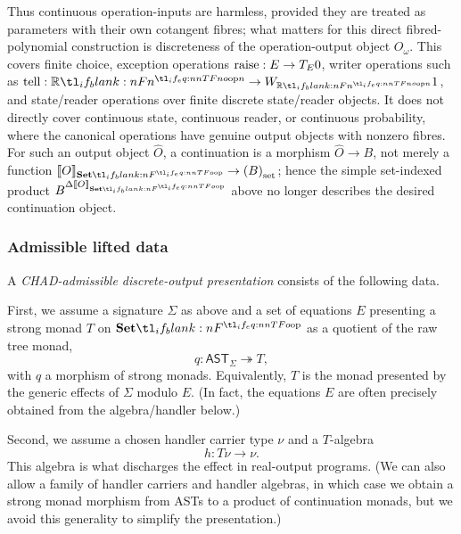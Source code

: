 \documentclass[11pt,a4paper]{article}
\theoremstyle{definition}
\theoremstyle{remark}
\providecommand{\AST}{\mathsf{AST}}
\providecommand{\base}[1]{\left(#1\right)_{\mathrm{set}}}
\providecommand{\setint}[1]{\llbracket #1\rrbracket_{\Set}}
\begin{document}
Thus continuous operation-inputs are harmless, provided they are treated as parameters with their own cotangent fibres; what matters for this direct fibred-polynomial construction is discreteness of the operation-output object \( O_{\omega} \). This covers finite choice, exception operations \( \opn{raise}:E\to T_E0 \), writer operations such as \( \opn{tell}:\R[n]\to W_{\R[n]}1 \), and state/reader operations over finite discrete state/reader objects. It does not directly cover continuous state, continuous reader, or continuous probability, where the canonical operations have genuine output objects with nonzero fibres. For such an output object \( \widehat O \), a continuation is a morphism \( \widehat O\to B \), not merely a function \( \setint{O}\to\base{B} \); hence the simple set-indexed product \(B^{\Delta\setint O}\) above no longer describes the desired continuation object.


\subsubsection{Admissible lifted data}

A \emph{CHAD-admissible discrete-output presentation} consists of the following data.

First, we assume a signature \( \Sigma \) as above and a set of equations \( E \) presenting a strong monad \(T\) on \(\Set\) as a quotient of the raw tree monad,
\[
  q:\AST_{\Sigma}\twoheadrightarrow T,
\]
with \(q\) a morphism of strong monads. Equivalently, \(T\) is the monad presented by the generic effects of \(\Sigma\) modulo \(E\).
(In fact, the equations \(E\) are often precisely obtained from the algebra/handler below.)

Second, we assume a chosen handler carrier type \(\nu\) and a \(T\)-algebra
\[
  h:T\nu\to \nu .
\]
This algebra is what discharges the effect in real-output programs.
(We can also allow a family of handler carriers and handler algebras, in which case we obtain a strong monad morphism from ASTs to a product of continuation monads, but we avoid this generality to simplify the presentation.)
\end{document}
